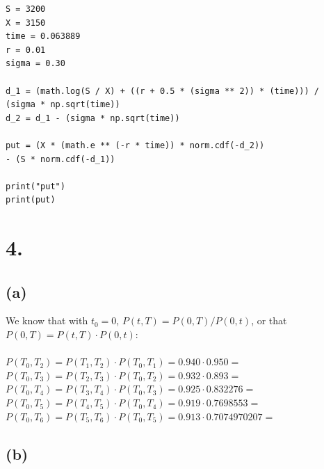 \documentclass{article}
\begin{document}
{\begin{verbatim}
S = 3200
X = 3150
time = 0.063889
r = 0.01
sigma = 0.30

d_1 = (math.log(S / X) + ((r + 0.5 * (sigma ** 2)) * (time))) / 
(sigma * np.sqrt(time))
d_2 = d_1 - (sigma * np.sqrt(time))

put = (X * (math.e ** (-r * time)) * norm.cdf(-d_2)) 
- (S * norm.cdf(-d_1))

print("put")
print(put)
\end{verbatim}
\newpage
}

\section*{4.}
{\Large 

\subsection*{(a)}
We know that with $t_0 = 0$, $P(t, T) = P(0, T) / P(0, t)$, or that \\
$P(0, T) = P(t, T) \cdot P(0, t)$: \\ \\
$P(T_0, T_2) = P(T_1, T_2) \cdot P(T_0, T_1) = 0.940 \cdot 0.950 = $  \\ 
$P (T_0, T_3) = P(T_2, T_3) \cdot P(T_0, T_2) = 0.932 \cdot 0.893 = $  \\
$P(T_0, T_4) = P(T_3, T_4) \cdot P(T_0, T_3) = 0.925 \cdot 0.832276 = $  \\
$P(T_0, T_5) = P(T_4, T_5) \cdot P(T_0, T_4) = 0.919 \cdot 0.7698553 = $  \\
$P(T_0, T_6) = P(T_5, T_6) \cdot P(T_0, T_5) = 0.913 \cdot 0.7074970207 =  $ 

\subsection*{(b)}

}
\end{document}

